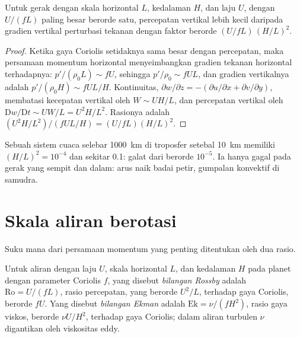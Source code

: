 \begin{proposition}\label{prop:b3:gfd-foundations:hydrostatic}
Untuk gerak dengan skala horizontal $L$, kedalaman $H$, dan laju $U$, dengan
 $U/(fL)$ paling besar berorde satu, percepatan vertikal
lebih kecil daripada gradien vertikal perturbasi tekanan dengan faktor
berorde $(U/fL)\,(H/L)^2$.
\end{proposition}

\begin{proof}
Ketika gaya Coriolis setidaknya sama besar dengan percepatan, maka
persamaan momentum horizontal menyeimbangkan gradien tekanan horizontal
terhadapnya: $p'/(\rho_0 L) \sim fU$, sehingga $p'/\rho_0 \sim fUL$, dan
gradien vertikalnya adalah $p'/(\rho_0 H) \sim fUL/H$. Kontinuitas, $\partial w/\partial z
= -(\partial u/\partial x + \partial v/\partial y)$, membatasi kecepatan vertikal
oleh $W \sim UH/L$, dan percepatan vertikal oleh
$\mathrm Dw/\mathrm Dt \sim UW/L = U^2H/L^2$. Rasionya adalah $(U^2H/L^2)/(fUL/H)
= (U/fL)(H/L)^2$.
\end{proof}

Sebuah sistem cuaca selebar \qty{1000}{km} di troposfer setebal \qty{10}{km} memiliki
$(H/L)^2 = 10^{-4}$ dan  sekitar 0.1: galat dari
 berorde $10^{-5}$. Ia hanya gagal pada gerak yang sempit dan dalam:
arus naik badai petir, gumpalan konvektif di samudra.

\section{Skala aliran berotasi}\label{sec:b3:gfd-foundations:scales}

Suku mana dari persamaan momentum yang penting ditentukan oleh dua rasio.

\begin{definition}\label{def:b3:gfd-foundations:numbers}
Untuk aliran dengan laju $U$, skala horizontal $L$, dan kedalaman $H$ pada planet dengan
parameter Coriolis $f$, yang disebut \emph{bilangan Rossby} adalah
$\mathrm{Ro} = U/(fL)$, rasio percepatan, yang berorde $U^2/L$,
terhadap gaya Coriolis, berorde $fU$. Yang disebut \emph{bilangan
Ekman} adalah $\mathrm{Ek} = \nu/(fH^2)$, rasio
gaya viskos, berorde $\nu U/H^2$, terhadap gaya Coriolis; dalam aliran
turbulen $\nu$ digantikan oleh viskositas eddy.
\end{definition}

